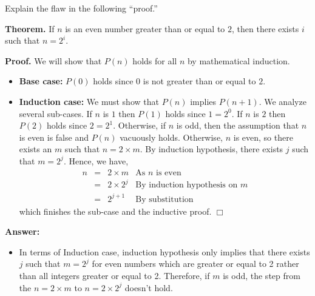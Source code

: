 \documentclass[11pt]{article}
\begin{document}
\begin{exercise}
Explain the flaw in the following ``proof.''

\begin{description}
\item \textbf{Theorem.} If $n$ is an even number greater than or equal
  to $2$, then there exists $i$ such that $n = 2^i$.

\item \textbf{Proof.} We will show that $P(n)$ holds for all $n$ by
  mathematical induction.

\begin{itemize}
\item \textbf{Base case:} $P(0)$ holds since $0$ is not greater than
  or equal to $2$. 

\item \textbf{Induction case:} We must show that $P(n)$ implies
  $P(n+1)$. We analyze several sub-cases. If $n$ is $1$ then $P(1)$
  holds since $1 = 2^0$. If $n$ is $2$ then $P(2)$ holds since $2 =
  2^1$. Otherwise, if $n$ is odd, then the assumption that $n$ is even
  is false and $P(n)$ vacuously holds. Otherwise, $n$ is even, so
  there exists an $m$ such that $n = 2 \times m$. By induction
  hypothesis, there exists $j$ such that $m = 2^j$. Hence, we have,
\[ 
\begin{array}{rcll}
n & = & 2 \times m   & \text{As $n$ is even}\\
  & = & 2 \times 2^j & \text{By induction hypothesis on $m$}\\
  & = & 2^{j+1}       & \text{By substitution}
\end{array}
\]
 which finishes the sub-case and the inductive proof. \hfill$\Box$
\end{itemize}
\end{description}
\noindent \textbf{Answer:}
\begin{itemize}	
\item In terms of Induction case, induction hypothesis only implies that there exists $j$ 	such that $m = 2^j$ for even numbers which are greater or equal to 2 rather than all integers greater or equal to 2. Therefore, if $m$ is odd, the step from the $ n = 2 \times m $ to $ n = 2 \times 2^j $ doesn't 	hold. 
\end{itemize}
\end{exercise}
\end{document}
